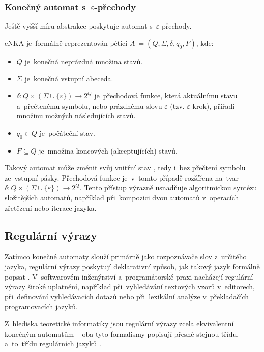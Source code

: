 \documentclass[
  master,
  program=ainfvs,
  printversion,
  figures=false,
  tables=false,
  glossaries,
  index
]{kidiplom}
\begin{document}
\subsubsection{Konečný automat s~$\varepsilon$-přechody}
Ještě vyšší míru abstrakce poskytuje automat s~$\varepsilon$-přechody. \begin{definition}
\gls{eNKA} je~formálně reprezentován pěticí $A~= (Q, \Sigma, \delta, q_0, F)$, kde:
\begin{itemize}
    \item $Q$ je~konečná neprázdná množina stavů.
    \item $\Sigma$ je~konečná vstupní abeceda.
    \item $\delta: Q \times (\Sigma \cup \{\varepsilon\}) \rightarrow 2^Q$ je~přechodová funkce, která aktuálnímu stavu a~přečtenému symbolu, nebo prázdnému slovu $\varepsilon$ (tzv. $\varepsilon$-krok), přiřadí množinu možných následujících stavů.
    \item $q_0 \in Q$ je~počáteční stav.
    \item $F \subseteq Q$ je~množina koncových (akceptujících) stavů.
\end{itemize}
\end{definition} Takový automat může změnit svůj vnitřní stav , tedy i~bez přečtení symbolu ze~vstupní pásky. Přechodová funkce je~v~tomto případě rozšířena na~tvar $\delta: Q \times (\Sigma \cup \{\varepsilon\}) \rightarrow 2^Q$. Tento přístup výrazně usnadňuje algoritmickou syntézu složitějších automatů, například při~kompozici dvou automatů v~operacích zřetězení nebo iterace jazyka.

\subsection{Regulární výrazy}
Zatímco konečné automaty slouží primárně jako rozpoznávače slov z~určitého jazyka, regulární výrazy poskytují deklarativní způsob, jak takový jazyk formálně popsat \cite[kapitola~3.12]{jancar_ti}. V~softwarovém inženýrství a~programátorské praxi nacházejí regulární výrazy široké uplatnění, například při~vyhledávání textových vzorů v~editorech, při~definování vyhledávacích dotazů nebo při~lexikální analýze v~překladačích programovacích jazyků.

Z~hlediska teoretické informatiky jsou regulární výrazy zcela ekvivalentní konečným automatům – oba tyto formalismy popisují přesně stejnou třídu, a~to~tří\-du regulárních jazyků \cite{cerna_fja}.
\end{document}

